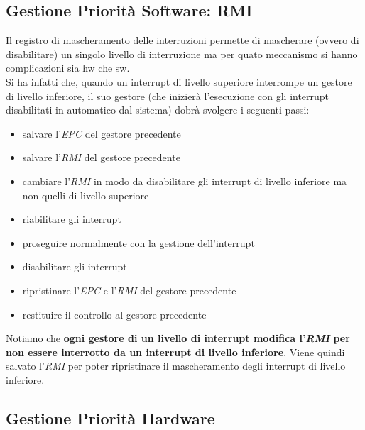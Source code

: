 \documentclass[a4paper,12pt, oneside]{book}
\begin{document}
\subsection{Gestione Priorità Software: RMI}
Il registro di mascheramento delle interruzioni permette di mascherare
(ovvero di disabilitare) un singolo livello di interruzione ma per
quato meccanismo si hanno complicazioni sia hw che sw.\\
Si ha infatti che, quando un interrupt di livello superiore interrompe
un gestore di livello inferiore, il suo gestore (che inizierà
l'esecuzione con gli interrupt disabilitati in automatico dal sistema)
dobrà svolgere i seguenti passi:
\begin{itemize}
  \item salvare l'\textit{EPC} del gestore precedente
  \item salvare l'\textit{RMI} del gestore precedente
  \item cambiare l'\textit{RMI} in modo da disabilitare gli interrupt
  di livello inferiore ma non quelli di livello superiore
  \item riabilitare gli interrupt
  \item proseguire normalmente con la gestione dell'interrupt
  \item disabilitare gli interrupt
  \item ripristinare l'\textit{EPC} e l'\textit{RMI} del gestore
  precedente
  \item restituire il controllo al gestore precedente
\end{itemize}
Notiamo che \textbf{ogni gestore di un livello di interrupt modifica
  l'\textit{RMI} per non essere interrotto da un interrupt di livello
inferiore}. Viene quindi salvato l'\textit{RMI} per poter ripristinare
il mascheramento degli interrupt di livello inferiore.
\subsection{Gestione Priorità Hardware}
\end{document}
